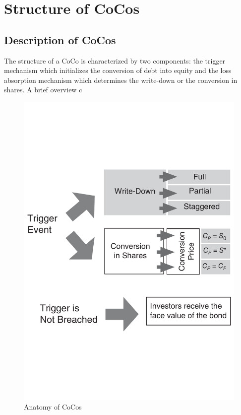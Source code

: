 \chapter{Structure of CoCos}

\section{Description of CoCos}

The structure of a CoCo is characterized by two components: the trigger mechanism which initializes the conversion of debt into equity and the loss absorption mechanism which determines the write-down or the conversion in shares. A brief overview c

\begin{figure}[ht]
	\centering
	\includegraphics[trim=0.6cm 7.05cm 0.9cm 7cm, scale = 0.4]{media/anatomy} \par
	\caption[Anatomy of CoCos]{Anatomy of CoCos \citep{de2014handbook}}
\end{figure}


